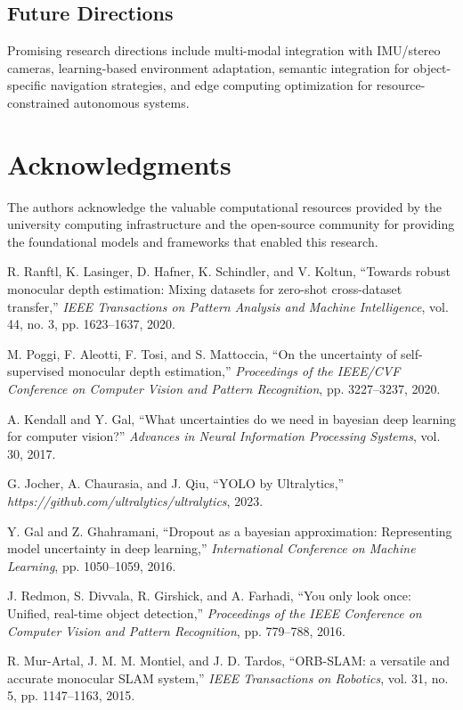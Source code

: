 \documentclass[12pt,oneside]{book}
\begin{document}
\subsection{Future Directions}

Promising research directions include multi-modal integration with IMU/stereo cameras, learning-based environment adaptation, semantic integration for object-specific navigation strategies, and edge computing optimization for resource-constrained autonomous systems.

\section*{Acknowledgments}

The authors acknowledge the valuable computational resources provided by the university computing infrastructure and the open-source community for providing the foundational models and frameworks that enabled this research.

\begin{thebibliography}{99}

R. Ranftl, K. Lasinger, D. Hafner, K. Schindler, and V. Koltun,
``Towards robust monocular depth estimation: Mixing datasets for zero-shot cross-dataset transfer,''
\emph{IEEE Transactions on Pattern Analysis and Machine Intelligence}, vol. 44, no. 3, pp. 1623--1637, 2020.

M. Poggi, F. Aleotti, F. Tosi, and S. Mattoccia,
``On the uncertainty of self-supervised monocular depth estimation,''
\emph{Proceedings of the IEEE/CVF Conference on Computer Vision and Pattern Recognition}, pp. 3227--3237, 2020.

A. Kendall and Y. Gal,
``What uncertainties do we need in bayesian deep learning for computer vision?''
\emph{Advances in Neural Information Processing Systems}, vol. 30, 2017.

G. Jocher, A. Chaurasia, and J. Qiu,
``YOLO by Ultralytics,''
\emph{https://github.com/ultralytics/ultralytics}, 2023.

Y. Gal and Z. Ghahramani,
``Dropout as a bayesian approximation: Representing model uncertainty in deep learning,''
\emph{International Conference on Machine Learning}, pp. 1050--1059, 2016.

J. Redmon, S. Divvala, R. Girshick, and A. Farhadi,
``You only look once: Unified, real-time object detection,''
\emph{Proceedings of the IEEE Conference on Computer Vision and Pattern Recognition}, pp. 779--788, 2016.

R. Mur-Artal, J. M. M. Montiel, and J. D. Tardos,
``ORB-SLAM: a versatile and accurate monocular SLAM system,''
\emph{IEEE Transactions on Robotics}, vol. 31, no. 5, pp. 1147--1163, 2015.

\end{thebibliography}
\end{document}
